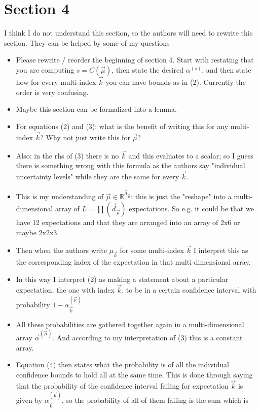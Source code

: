 \documentclass{article}[12pt]
\newcommand{\RefereeTODO}[1]{{\color{red} #1 \newline}}
\begin{document}
\section{Section 4}

\RefereeTODO{I think I do not understand this section, so the authors will need to rewrite
this section. They can be helped by some of my questions}

\begin{itemize}
    \item \RefereeTODO{Please rewrite / reorder the beginning of section 4. Start with restating that you are computing $s = C(\vec{\mu})$, then state the desired $\alpha^{(s)}$, and then state how for every multi-index $\vec{k}$ you can have bounds as in (2). Currently the order is very confusing.}
    \item \RefereeTODO{Maybe this section can be formalized into a lemma.}
    \item \RefereeTODO{For equations (2) and (3): what is the benefit of writing this for any multi-index $\vec{k}$? Why not just write this for $\vec{\mu}$?}
    \item \RefereeTODO{Also: in the rhs of (3) there is no $\vec{k}$ and this evaluates to a scalar; so I guess there is something wrong with this formula as the authors say "individual uncertainty levels" while they are the same for every $\vec{k}$.}
    \item \RefereeTODO{This is my understanding of $\vec{\mu} \in \mathbb{R}^{\vec{d}_{\vec{\mu}}}$: this is just the "reshape" into a multi-dimensional array of $L = \prod(\vec{d}_{\vec{\mu}})$ expectations. So e.g. it could be that we have 12 expectations and that they are arranged into an array of 2x6 or maybe 2x2x3.}
    \item \RefereeTODO{Then when the authors write $\mu_{\vec{k}}$ for some multi-index $\vec{k}$ I interpret this as the corresponding index of the expectation in that multi-dimensional array.}
    \item \RefereeTODO{In this way I interpret (2) as making a statement about a particular expectation, the one with index $\vec{k}$, to be in a certain confidence interval with probability $1 - \alpha_{\vec{k}}^{(\vec{\mu})}$.}
    \item \RefereeTODO{All these probabilities are gathered together again in a multi-dimensional array $\vec{\alpha}^{(\vec{\mu})}$. And according to my interpretation of (3) this is a constant array.}
    \item \RefereeTODO{Equation (4) then states what the probability is of all the individual confidence bounds to hold all at the same time. This is done through saying that the probability of the confidence interval failing for expectation $\vec{k}$ is given by $\alpha_{\vec{k}}^{(\vec{\mu})}$, so the probability of all of them failing is the sum which is
}
\end{itemize}
\end{document}
